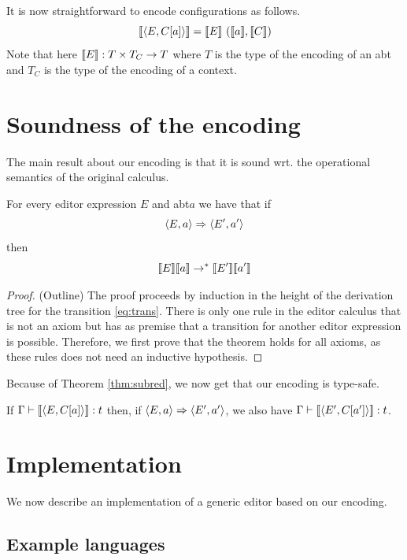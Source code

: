 \documentclass[sigplan,review]{acmart}
\newcommand{\abt}{\textsf{abt}\xspace}
\begin{document}
It is now straightforward to encode configurations as follows.
%
\[ \llbracket \langle E, C[a] \rangle \rrbracket = \llbracket E \rrbracket \  (\llbracket a \rrbracket, \llbracket C \rrbracket) \]
%
Note that here $\llbracket E \rrbracket : T \times T_C \to T$ where $T$ is the type
of the encoding of an \abt and $T_C$ is the type of the encoding of a context.

\section{Soundness of the encoding}

The main result about our encoding is that it is sound wrt. the
operational semantics of the original calculus.

\begin{theorem}[Soundness] For every editor expression $E$ and \abt $a$
  we have that if
  \begin{equation} \langle E,a \rangle \stackrel{}{\Rightarrow} \langle E',a' \rangle \label{eq:trans} \end{equation}
  then
  \begin{equation} \llbracket E \rrbracket\llbracket a \rrbracket \rightarrow^{\ast}
    \llbracket E' \rrbracket\llbracket a' \rrbracket  \label{eq:ctrans} \end{equation}
\end{theorem}
\begin{proof}(Outline) The proof proceeds by induction in the height
  of the derivation tree for the transition \eqref{eq:trans}. There is
  only one rule in the editor calculus that is not an axiom but has as
  premise that a transition for another editor expression is
  possible. Therefore, we first prove that the theorem holds for all
  axioms, as these rules does not need an inductive hypothesis.
\end{proof}
Because of Theorem \ref{thm:subred}, we now get that our encoding is
type-safe.

\begin{corollary}
  If $\Gamma \vdash \llbracket \langle E,C[a] \rangle \rrbracket : t$ then, if $\langle E,a \rangle
  \stackrel{}{\Rightarrow} \langle E',a' \rangle$, we also have $\Gamma \vdash \llbracket \langle E',C[a'] \rangle \rrbracket : t$.
\end{corollary}

\section{Implementation}

We now describe an implementation of a generic editor based on our
encoding.

\subsection{Example languages}
\end{document}
